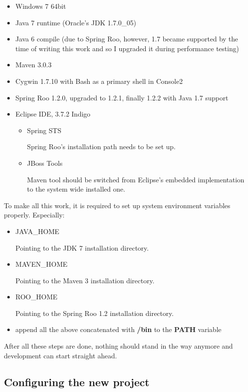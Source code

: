 	\begin{itemize}
		\item Windows 7 64bit
		\item Java 7 runtime (Oracle's JDK 1.7.0\_05)
		\item Java 6 compile (due to Spring Roo, however, 1.7 became supported by the time of writing this work and so I
		upgraded it during performance testing)
		\item Maven 3.0.3
		\item Cygwin 1.7.10 with Bash as a primary shell in Console2
		\item Spring Roo 1.2.0, upgraded to 1.2.1, finally 1.2.2 with Java 1.7 support
		\item Eclipse IDE, 3.7.2 Indigo
		\begin{itemize}
			\item Spring STS
			
			Spring Roo's installation path needs to be set up.
			\item JBoss Tools  
			
			Maven tool should be switched from Eclipse's embedded implementation to the system wide installed one.
		\end{itemize}
	\end{itemize}
	
	To make all this work, it is required to set up system environment variables properly. Especially:
	
	\begin{itemize}
		\item JAVA\_HOME
		
		Pointing to the JDK 7 installation directory.
		\item MAVEN\_HOME
		
		Pointing to the Maven 3 installation directory.
		\item ROO\_HOME
		
		Pointing to the Spring Roo 1.2 installation directory.
		\item append all the above concatenated with \textbf{/bin} to the \textbf{PATH} variable 
	\end{itemize}
	
	After all these steps are done, nothing should stand in the way anymore and development can start straight ahead.
	
	\subsection{Configuring the new project}
	
